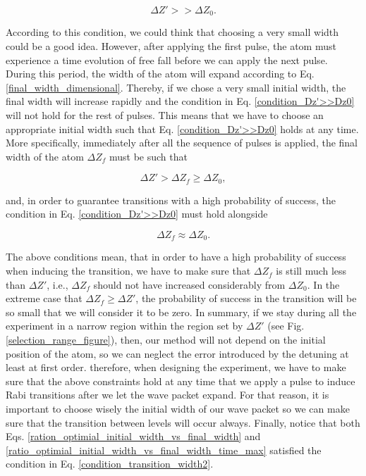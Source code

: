 \documentclass{article}
\begin{document}
\begin{equation}\label{condition_Dz'>>Dz0}
    \Delta Z' >> \Delta Z_{0}.
\end{equation}

According to this condition, we could think that choosing a very small width could be a good idea. However, after applying the first pulse, the atom must experience a time evolution of free fall before we can apply the next pulse. During this period, the width of the atom will expand according to Eq. \ref{final_width_dimensional}. Thereby, if we chose a very small initial width, the final width will increase rapidly and the condition in Eq. \ref{condition_Dz'>>Dz0} will not hold for the rest of pulses. This means that we have to choose an appropriate initial width such that Eq. \ref{condition_Dz'>>Dz0} holds at any time. More specifically, immediately after all the sequence of pulses is applied, the final width of the atom $\Delta Z_{f}$ must be such that

\begin{equation}\label{condition_transition_width1}
    \Delta Z' > \Delta Z_{f} \ge \Delta Z_{0},
\end{equation}

and, in order to guarantee transitions with a high probability of success, the condition in Eq. \ref{condition_Dz'>>Dz0} must hold alongside

\begin{equation}\label{condition_transition_width2}
    \Delta Z_{f} \approx \Delta Z_{0}.
\end{equation}

The above conditions mean, that in order to have a high probability of success when inducing the transition, we have to make sure that $\Delta Z_{f}$ is still much less than $\Delta Z'$, i.e.,  $\Delta Z_{f}$ should not have increased considerably from $\Delta Z_{0}$. In the extreme case that $\Delta Z_{f} \ge \Delta Z'$, the probability of success in the transition will be so small that we will consider it to be zero. 
In summary, if we stay during all the experiment in a narrow region within the region set by $\Delta Z'$ (see Fig. \ref{selection_range_figure}), then, our method will not depend on the initial position of the atom, so we can neglect the error introduced by the detuning at least at first order.
therefore, when designing the experiment, we have to make sure that the above constraints hold at any time that we apply a pulse to induce Rabi transitions after we let the wave packet expand. For that reason, it is important to choose wisely the initial width of our wave packet so we can make sure that the transition between levels will occur always. Finally, notice that both Eqs. \ref{ration_optimial_initial_width_vs_final_width} and 
\ref{ratio_optimial_initial_width_vs_final_width_time_max} satisfied the condition in Eq. \ref{condition_transition_width2}.
\end{document}
